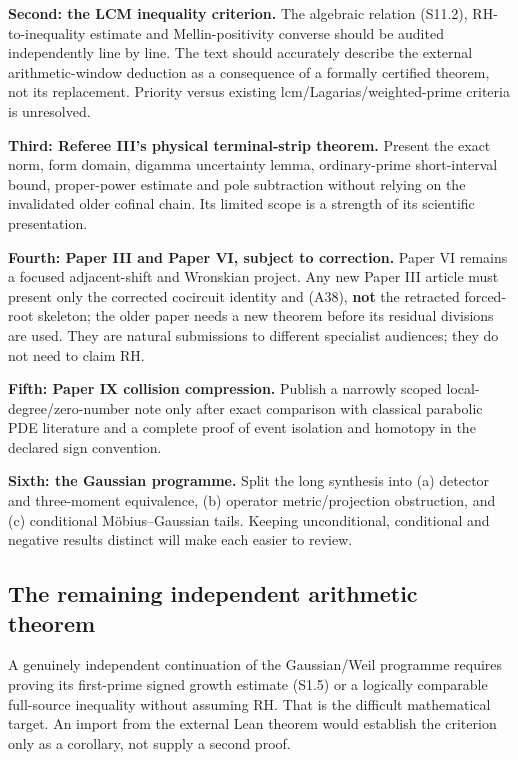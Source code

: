 \documentclass[
  10pt,
  a4paper,
  10pt,
  oneside,
  openany]{book}
\begin{document}
\textbf{Second: the LCM inequality criterion.} The algebraic relation
(S11.2), RH-to-inequality estimate and Mellin-positivity converse should
be audited independently line by line. The text should accurately
describe the external arithmetic-window deduction as a consequence of a
formally certified theorem, not its replacement. Priority versus
existing lcm/Lagarias/weighted-prime criteria is unresolved.

\textbf{Third: Referee III's physical terminal-strip theorem.} Present
the exact norm, form domain, digamma uncertainty lemma, ordinary-prime
short-interval bound, proper-power estimate and pole subtraction without
relying on the invalidated older cofinal chain. Its limited scope is a
strength of its scientific presentation.

\textbf{Fourth: Paper III and Paper VI, subject to correction.} Paper VI
remains a focused adjacent-shift and Wronskian project. Any new Paper
III article must present only the corrected cocircuit identity and
(A38), \textbf{not} the retracted forced-root skeleton; the older paper
needs a new theorem before its residual divisions are used. They are
natural submissions to different specialist audiences; they do not need
to claim RH.

\textbf{Fifth: Paper IX collision compression.} Publish a narrowly
scoped local-degree/zero-number note only after exact comparison with
classical parabolic PDE literature and a complete proof of event
isolation and homotopy in the declared sign convention.

\textbf{Sixth: the Gaussian programme.} Split the long synthesis into
(a) detector and three-moment equivalence, (b) operator
metric/projection obstruction, and (c) conditional Möbius--Gaussian
tails. Keeping unconditional, conditional and negative results distinct
will make each easier to review.

\subsection{The remaining independent arithmetic
theorem}\label{the-remaining-independent-arithmetic-theorem}

A genuinely independent continuation of the Gaussian/Weil programme
requires proving its first-prime signed growth estimate (S1.5) or a
logically comparable full-source inequality without assuming RH. That is
the difficult mathematical target. An import from the external Lean
theorem would establish the criterion only as a corollary, not supply a
second proof.
\end{document}
